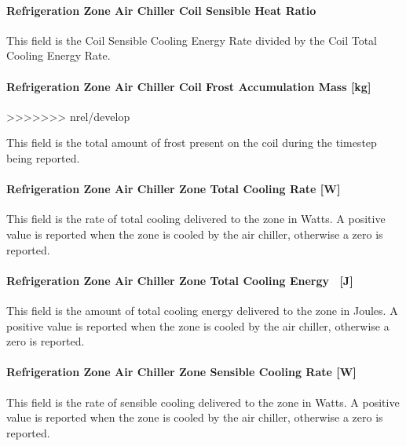 \paragraph{Refrigeration Zone Air Chiller Coil Sensible Heat Ratio}\label{refrigeration-zone-air-chiller-coil-sensible-heat-ratio}

This field is the Coil Sensible Cooling Energy Rate divided by the Coil Total Cooling Energy Rate.

\paragraph{Refrigeration Zone Air Chiller Coil Frost Accumulation Mass {[}kg{]}}\label{refrigeration-zone-air-chiller-coil-frost-accumulation-mass-kg}
>>>>>>> nrel/develop

This field is the total amount of frost present on the coil during the timestep being reported.

\paragraph{Refrigeration Zone Air Chiller Zone Total Cooling Rate {[}W{]}}\label{refrigeration-zone-air-chiller-zone-total-cooling-rate-w}

This field is the rate of total cooling delivered to the zone in Watts. A positive value is reported when the zone is cooled by the air chiller, otherwise a zero is reported.

\paragraph{Refrigeration Zone Air Chiller Zone Total Cooling Energy ~{[}J{]}}\label{refrigeration-zone-air-chiller-zone-total-cooling-energy-j}

This field is the amount of total cooling energy delivered to the zone in Joules. A positive value is reported when the zone is cooled by the air chiller, otherwise a zero is reported.

\paragraph{Refrigeration Zone Air Chiller Zone Sensible Cooling Rate {[}W{]}}\label{refrigeration-zone-air-chiller-zone-sensible-cooling-rate-w}

This field is the rate of sensible cooling delivered to the zone in Watts. A positive value is reported when the zone is cooled by the air chiller, otherwise a zero is reported.

